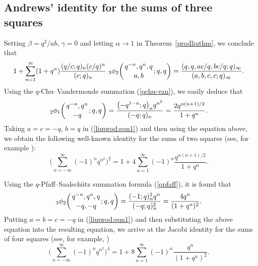 \documentclass[pdftex]{sigma}
\numberwithin{equation}{section}
\begin{document}
\subsection{Andrews' identity for the sums of three squares}
Setting $\beta=q^2/ab$, $\gamma=0$ and letting $\alpha \to 1$ in Theorem~\ref{prodliuthm}, we conclude that
\begin{align}\label{liuprod:eqn1}
	1+\sum_{n=1}^\infty (1+q^n)\frac{(q/c; q)_n (c/q)^n}{(c; q)_n}~ {_3 \phi_2} \biggl({{q^{-n}, q^n, q}
		\atop{ a, b}}; q, q\biggr)
	=\frac{(q, q, ac/q, bc/q; q)_\infty}{(a, b, c, c; q )_\infty}.
\end{align}
Using the $q$-Chu--Vandermonde summation (\ref{qchu-van}), we easily deduce that
\begin{equation}\label{liuprod:eqn2}
	{_2\phi_1}\biggl({{q^{-n}, q^n}
		\atop{-q}}; q, q\biggr)=\frac{\bigl(-q^{1-n}; q\bigr)_n q^{n^2}}{(-q; q)_n}
	=\frac{2q^{n(n+1)/2}}{1+q^n}.
\end{equation}	
Taking $a=c=-q$, $b=q$ in (\ref{liuprod:eqn1}) and then using the equation above, we obtain the following well-known identity for the sums of two squares (see, for example \cite[equation~(3.35)]{Andrews74}):
\begin{equation*}%
\Biggl(\sum_{n=-\infty}^\infty (-1)^n q^{n^2}\Biggr)^{2}=1+4\sum_{n=1}^\infty (-1)^n\frac{q^{n(n+1)/2}}{1+q^n}.
\end{equation*}

Using the $q$-Pfaff--Saalsch\"utz summation formula (\ref{qpfaff}), it is found that
\begin{equation*}%
	{_{3}\phi_{2}}\biggl({{q^{-n}, q^n, q}
		\atop{-q, -q}}; q, q\biggr)=\frac{(-1; q)^2_n q^n}{(-q; q)^2_n}=\frac{4q^n}{(1+q^n)^2}.
\end{equation*}	
Putting $a=b=c=-q$ in (\ref{liuprod:eqn1}) and then substituting the above equation into the resulting equation, we arrive at
the Jacobi identity for the sums of four squares (see, for example, \cite[equation~(3.40)]{Andrews74})
\begin{equation*}	%
	\Biggl(\sum_{n=-\infty}^\infty (-1)^n q^{n^2}\Biggr)^{4}=1+8\sum_{n=1}^\infty (-1)^n\frac{q^n}{(1+q^n)^2}.
\end{equation*}
\end{document}
